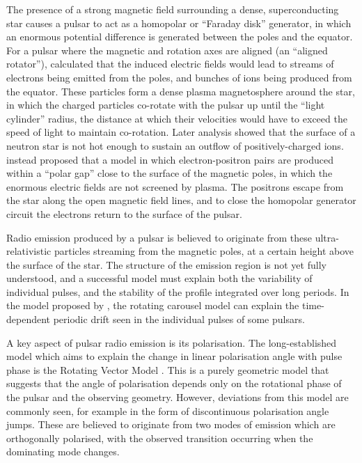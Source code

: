 The presence of a strong magnetic field surrounding a dense, superconducting star causes a pulsar to act as a homopolar or ``Faraday disk'' generator, in which an enormous potential difference is generated between the poles and the equator. For a pulsar where the magnetic and rotation axes are aligned (an ``aligned rotator''), \citet{GJxx1969} calculated that the induced electric fields would lead to streams of electrons being emitted from the poles, and bunches of ions being produced from the equator. These particles form a dense plasma magnetosphere around the star, in which the charged particles co-rotate with the pulsar up until the ``light cylinder'' radius, the distance at which their velocities would have to exceed the speed of light to maintain co-rotation. Later analysis showed that the surface of a neutron star is not hot enough to sustain an outflow of positively-charged ions. \citet{RSxx1975} instead proposed that a model in which electron-positron pairs are produced within a ``polar gap'' close to the surface of the magnetic poles, in which the enormous electric fields are not screened by plasma. The positrons escape from the star along the open magnetic field lines, and to close the homopolar generator circuit the electrons return to the surface of the pulsar.

Radio emission produced by a pulsar is believed to originate from these ultra-relativistic particles streaming from the magnetic poles, at a certain height above the surface of the star. The structure of the emission region is not yet fully understood, and a successful model must explain both the variability of individual pulses, and the stability of the profile integrated over long periods. In the model proposed by \citet{RSxx1975}, the rotating carousel model can explain the time-dependent periodic drift seen in the individual pulses of some pulsars. 

A key aspect of pulsar radio emission is its polarisation. The long-established model which aims to explain the change in linear polarisation angle with pulse phase is the Rotating Vector Model \citep[RVM;][]{RCxx1969}. This is a purely geometric model that suggests that the angle of polarisation depends only on the rotational phase of the pulsar and the observing geometry. However, deviations from this model are commonly seen, for example in the form of discontinuous polarisation angle jumps. These are believed to originate from two modes of emission which are orthogonally polarised, with the observed transition occurring when the dominating mode changes.

